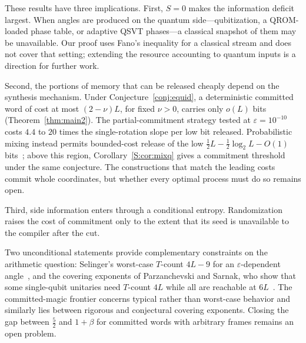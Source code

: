 \documentclass[aps,prx,twocolumn,superscriptaddress,nofootinbib,longbibliography]{revtex4-2}
\theoremstyle{plain}
\theoremstyle{definition}
\theoremstyle{remark}
\begin{document}
These results have three implications. First, $S=0$ makes the information deficit largest. When angles are produced on the quantum side---qubitization, a QROM-loaded phase table, or adaptive QSVT phases---a classical snapshot of them may be unavailable. Our proof uses Fano's inequality for a classical stream and does not cover that setting; extending the resource accounting to quantum inputs is a direction for further work.

Second, the portions of memory that can be released cheaply depend on the synthesis mechanism. Under Conjecture~\ref{conj:equid}, a deterministic committed word of cost at most $(2-\nu)L$, for fixed $\nu>0$, carries only $o(L)$ bits (Theorem~\ref{thm:main2}). The partial-commitment strategy tested at $\varepsilon=10^{-10}$ costs $4.4$ to $20$ times the single-rotation slope per low bit released. Probabilistic mixing instead permits bounded-cost release of the low $\tfrac12L-\tfrac12\log_2L-O(1)$ bits~\cite{Bothe}; above this region, Corollary~\ref{S:cor:mixq} gives a commitment threshold under the same conjecture. The constructions that match the leading costs commit whole coordinates, but whether every optimal process must do so remains open.

Third, side information enters through a conditional entropy. Randomization raises the cost of commitment only to the extent that its seed is unavailable to the compiler after the cut.

Two unconditional statements provide complementary constraints on the arithmetic question: Selinger's worst-case $T$-count $4L-9$ for an $\varepsilon$-dependent angle~\cite[Thm.~30]{Selinger15}, and the covering exponents of Parzanchevski and Sarnak, who show that some single-qubit unitaries need $T$-count $4L$ while all are reachable at $6L$~\cite{PS18}. The committed-magic frontier concerns typical rather than worst-case behavior and similarly lies between rigorous and conjectural covering exponents. Closing the gap between $\tfrac52$ and $1+\beta$ for committed words with arbitrary frames remains an open problem.
\end{document}
